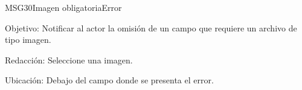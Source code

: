 \begin{mensaje}{MSG30}{Imagen obligatoria}{Error}
	\item [Objetivo:] Notificar al actor la omisión de un campo que requiere un archivo de tipo imagen.
	\item[Redacción:] Seleccione una imagen.
	\item [Ubicación:] Debajo del campo donde se presenta el error.
\end{mensaje}